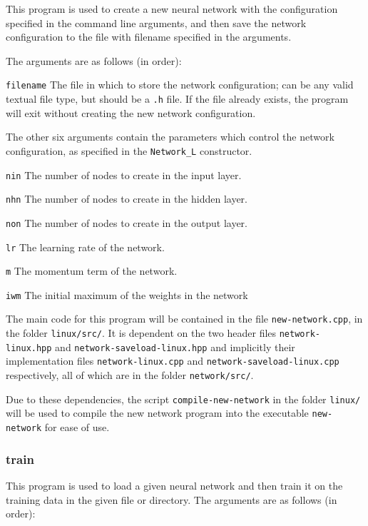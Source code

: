 \documentclass[a4paper]{article}
\begin{document}
This program is used to create a new neural network with the configuration specified in the command line arguments, and then save the network configuration to the file with filename specified in the arguments.

The arguments are as follows (in order):

\lstinline{filename} The file in which to store the network configuration; can be any valid textual file type, but should be a \lstinline{.h} file. If the file already exists, the program will exit without creating the new network configuration.

The other six arguments contain the parameters which control the network configuration, as specified in the \lstinline{Network_L} constructor.

\lstinline{nin} The number of nodes to create in the input layer.

\lstinline{nhn} The number of nodes to create in the hidden layer.

\lstinline{non} The number of nodes to create in the output layer.

\lstinline{lr} The learning rate of the network.

\lstinline{m} The momentum term of the network.

\lstinline{iwm} The initial maximum of the weights in the network

The main code for this program will be contained in the file \lstinline{new-network.cpp}, in the folder \lstinline{linux/src/}. It is dependent on the two header files \lstinline{network-linux.hpp} and \lstinline{network-saveload-linux.hpp} and implicitly their implementation files \lstinline{network-linux.cpp} and \lstinline{network-saveload-linux.cpp} respectively, all of which are in the folder \lstinline{network/src/}.


Due to these dependencies, the script \lstinline{compile-new-network} in the folder \lstinline{linux/} will be used to compile the new network program into the executable \lstinline{new-network} for ease of use.

\subsubsection{train}
\label{subsubsec:dc_csa_train}

This program is used to load a given neural network and then train it on the training data in the given file or directory. The arguments are as follows (in order):
\end{document}
